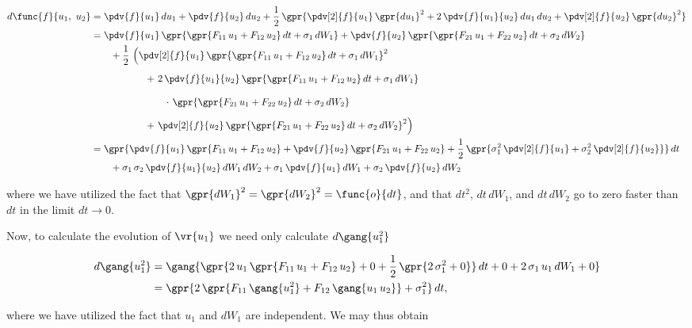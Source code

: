 \begin{enumerate}[a)]
	\begin{align}
		d\func{f}{u_1,\ u_2} &= \pdv{f}{u_1}\,du_1 + \pdv{f}{u_2}\,du_2 + \frac{1}{2}\,\gpr{\pdv[2]{f}{u_1}\,\gpr{du_1}^2 + 2\,\pdv{f}{u_1}{u_2}\,du_1\,du_2 + \pdv[2]{f}{u_2}\,\gpr{du_2}^2} \nonumber \\
			&= \pdv{f}{u_1}\,\gpr{\gpr{F_{11}\,u_1 + F_{12}\,u_2}\,dt + \sigma_1\,dW_1} + \pdv{f}{u_2}\,\gpr{\gpr{F_{21}\,u_1 + F_{22}\,u_2}\,dt + \sigma_2\,dW_2} \nonumber \\
				&\qquad + \frac{1}{2}\,\left( \pdv[2]{f}{u_1}\,\gpr{\gpr{F_{11}\,u_1 + F_{12}\,u_2}\,dt + \sigma_1\,dW_1}^2 \right. \nonumber \\
				&\qquad\qquad \phantom{+ \frac{1}{2}} + \left. 2\,\pdv{f}{u_1}{u_2}\,\gpr{\gpr{F_{11}\,u_1 + F_{12}\,u_2}\,dt + \sigma_1\,dW_1} \right. \nonumber \\
				&\qquad\qquad\qquad \phantom{+ \frac{1}{2}} \cdot \left. \gpr{\gpr{F_{21}\,u_1 + F_{22}\,u_2}\,dt + \sigma_2\,dW_2} \right. \nonumber \\
				&\qquad\qquad \phantom{+ \frac{1}{2}} + \left. \pdv[2]{f}{u_2}\,\gpr{\gpr{F_{21}\,u_1 + F_{22}\,u_2}\,dt + \sigma_2\,dW_2}^2 \right) \nonumber \\
			&= \gpr{\pdv{f}{u_1}\,\gpr{F_{11}\,u_1 + F_{12}\,u_2} + \pdv{f}{u_2}\,\gpr{F_{21}\,u_1 + F_{22}\,u_2} + \frac{1}{2}\,\gpr{\sigma_1^2\,\pdv[2]{f}{u_1} + \sigma_2^2\,\pdv[2]{f}{u_2}}}\,dt \nonumber \\
			&\qquad + \sigma_1\,\sigma_2\,\pdv{f}{u_1}{u_2}\,dW_1\,dW_2 + \sigma_1\,\pdv{f}{u_1}\,dW_1 + \sigma_2\,\pdv{f}{u_2}\,dW_2
	\end{align}
	
	where we have utilized the fact that $\gpr{dW_1}^2 = \gpr{dW_2}^2 = \func{o}{dt}$, and that $dt^2$, $dt\,dW_1$, and $dt\,dW_2$ go to zero faster than $dt$ in the limit $dt \to 0$.
	
	Now, to calculate the evolution of $\vr{u_1}$ we need only calculate $d\gang{u_1^2}$
	
	\begin{align}
		d\gang{u_1^2} &= \gang{\gpr{2\,u_1\,\gpr{F_{11}\,u_1 + F_{12}\,u_2} + 0 + \frac{1}{2}\,\gpr{2\,\sigma_1^2 + 0}}\,dt + 0 + 2\,\sigma_1\,u_1\,dW_1 + 0} \nonumber \\
			&= \gpr{2\,\gpr{F_{11}\,\gang{u_1^2} + F_{12}\,\gang{u_1\,u_2}} + \sigma_1^2}\,dt,
	\end{align}
	
	where we have utilized the fact that $u_1$ and $dW_1$ are independent. We may thus obtain
	

\end{enumerate}
